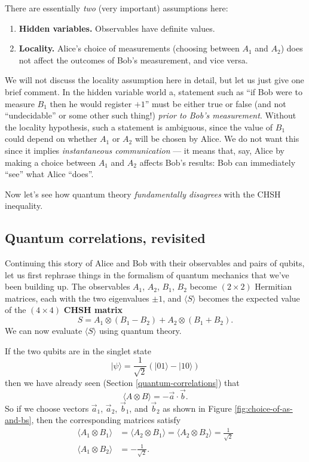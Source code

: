 \documentclass[fleqn]{article}
\providecommand{\tightlist}{%
  \setlength{\itemsep}{0pt}\setlength{\parskip}{0pt}}
\renewcommand{\footnote}[1]{\en{#1}}
\begin{document}
There are essentially \emph{two} (very important) assumptions here:

\begin{enumerate}
\def\labelenumi{\arabic{enumi}.}
\tightlist
\item
  \textbf{Hidden variables.} Observables have definite values.
\item
  \textbf{Locality.} Alice's choice of measurements (choosing between \(A_1\) and \(A_2\)) does not affect the outcomes of Bob's measurement, and vice versa.
\end{enumerate}

We will not discuss the locality assumption here in detail, but let us just give one brief comment.
In the hidden variable world a, statement such as ``if Bob were to measure \(B_1\) then he would register \(+1\)'' must be either true or false (and not ``undecidable'' or some other such thing!) \emph{prior to Bob's measurement}.
Without the locality hypothesis, such a statement is ambiguous, since the value of \(B_1\) could depend on whether \(A_1\) or \(A_2\) will be chosen by Alice.
We do not want this since it implies \emph{instantaneous communication} --- it means that, say, Alice by making a choice between \(A_1\) and \(A_2\) affects Bob's results: Bob can immediately ``see'' what Alice ``does''.

Now let's see how quantum theory \emph{fundamentally disagrees} with the CHSH inequality.

\hypertarget{quantum-correlations-revisited}{%
\subsection{Quantum correlations, revisited}\label{quantum-correlations-revisited}}

Continuing this story of Alice and Bob with their observables and pairs of qubits, let us first rephrase things in the formalism of quantum mechanics that we've been building up.
The observables \(A_1\), \(A_2\), \(B_1\), \(B_2\) become \((2\times 2)\) Hermitian matrices, each with the two eigenvalues \(\pm 1\), and \(\langle S\rangle\) becomes the expected value of the \((4\times 4)\) \textbf{CHSH matrix}
\[
  S = A_1\otimes(B_1-B_2) + A_2\otimes(B_1+B_2).
\]
We can now evaluate \(\langle S\rangle\) using quantum theory.

If the two qubits are in the singlet state
\[
  |\psi\rangle
  = \frac{1}{\sqrt{2}} \left( |01\rangle-|10\rangle \right)
\]
then we have already seen (Section \ref{quantum-correlations}) that
\[
  \langle A\otimes B\rangle = -\vec{a}\cdot\vec{b}.
\]
So if we choose vectors \(\vec{a}_1\), \(\vec{a}_2\), \(\vec{b}_1\), and \(\vec{b}_2\) as shown in Figure \ref{fig:choice-of-as-and-bs}, then the corresponding matrices\footnote{That is, \(A_1=\vec{a}_1\cdot\vec{\sigma}\), and so on.} satisfy
\[
\begin{aligned}
  \langle A_1\otimes B_1\rangle
  &= \langle A_2\otimes B_1\rangle
  = \langle A_2\otimes B_2\rangle
  = \frac{1}{\sqrt{2}}
\\\langle A_1\otimes B_2\rangle
  &= -\frac{1}{\sqrt{2}}.
\end{aligned}
\]
\end{document}
